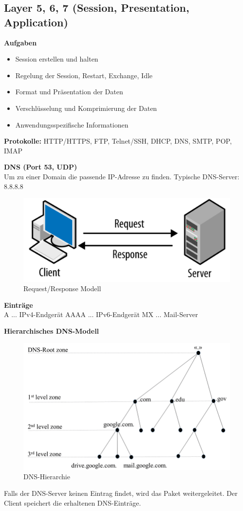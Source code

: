 \subsection{Layer 5, 6, 7 (Session, Presentation, Application)}
\textbf{Aufgaben}
\begin{itemize}
	\item Session erstellen und halten
	\item Regelung der Session, Restart, Exchange, Idle
	\item Format und Präsentation der Daten
	\item Verschlüsselung und Komprimierung der Daten
	\item Anwendungsspezifische Informationen
\end{itemize}

\textbf{Protokolle:} HTTP/HTTPS, FTP, Telnet/SSH, DHCP, DNS, SMTP, POP, IMAP

\textbf{DNS (Port 53, UDP)} \\
Um zu einer Domain die passende IP-Adresse zu finden.
Typische DNS-Server: 8.8.8.8

\begin{figure}[H]
	\centering
	\includegraphics[width=0.8\linewidth]{figures/request_response.png}
	\caption{Request/Response Modell}
\end{figure}

\textbf{Einträge} \\
A ... IPv4-Endgerät
AAAA ... IPv6-Endgerät
MX ... Mail-Server

\textbf{Hierarchisches DNS-Modell}
\begin{figure}[H]
	\centering
	\includegraphics[width=0.8\linewidth]{figures/dns_hierarchy.png}
	\caption{DNS-Hierarchie}
\end{figure}
Falls der DNS-Server keinen Eintrag findet, wird das Paket weitergeleitet. Der Client speichert die erhaltenen DNS-Einträge.


